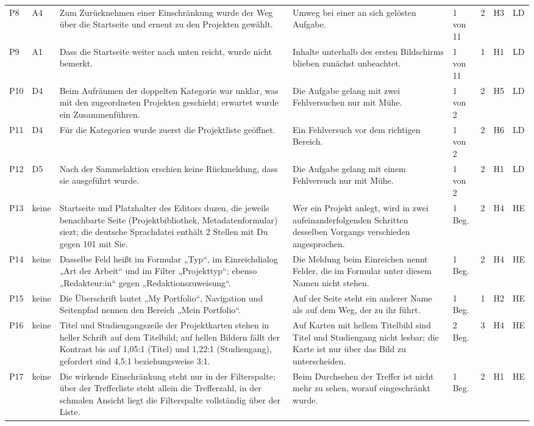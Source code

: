 \begin{longtable}{@{}L{0.6cm}L{0.8cm}L{4.9cm}L{4.0cm}L{1.2cm}L{0.7cm}L{0.7cm}L{0.8cm}@{}}
	P8 & A4 & Zum Zurücknehmen einer Einschränkung wurde der Weg über die Startseite und erneut zu den Projekten gewählt. & Umweg bei einer an sich gelösten Aufgabe. & 1 von 11 & 2 & H3 & LD \\
	P9 & A1 & Dass die Startseite weiter nach unten reicht, wurde nicht bemerkt. & Inhalte unterhalb des ersten Bildschirms blieben zunächst unbeachtet. & 1 von 11 & 1 & H1 & LD \\
	P10 & D4 & Beim Aufräumen der doppelten Kategorie war unklar, was mit den zugeordneten Projekten geschieht; erwartet wurde ein Zusammenführen. & Die Aufgabe gelang mit zwei Fehlversuchen nur mit Mühe. & 1 von 2 & 2 & H5 & LD \\
	P11 & D4 & Für die Kategorien wurde zuerst die Projektliste geöffnet. & Ein Fehlversuch vor dem richtigen Bereich. & 1 von 2 & 2 & H6 & LD \\
	P12 & D5 & Nach der Sammelaktion erschien keine Rückmeldung, dass sie ausgeführt wurde. & Die Aufgabe gelang mit einem Fehlversuch nur mit Mühe. & 1 von 2 & 2 & H1 & LD \\
	P13 & keine & Startseite und Platzhalter des Editors duzen, die jeweils benachbarte Seite (Projektbibliothek, Metadatenformular) siezt; die deutsche Sprachdatei enthält 2 Stellen mit Du gegen 101 mit Sie. & Wer ein Projekt anlegt, wird in zwei aufeinanderfolgenden Schritten desselben Vorgangs verschieden angesprochen. & 1 Beg. & 2 & H4 & HE \\
	P14 & keine & Dasselbe Feld heißt im Formular „Typ“, im Einreichdialog „Art der Arbeit“ und im Filter „Projekttyp“; ebenso „Redakteur:in“ gegen „Redaktionszuweisung“. & Die Meldung beim Einreichen nennt Felder, die im Formular unter diesem Namen nicht stehen. & 1 Beg. & 2 & H4 & HE \\
	P15 & keine & Die Überschrift lautet „My Portfolio“, Navigation und Seitenpfad nennen den Bereich „Mein Portfolio“. & Auf der Seite steht ein anderer Name als auf dem Weg, der zu ihr führt. & 1 Beg. & 1 & H2 & HE \\
	P16 & keine & Titel und Studiengangszeile der Projektkarten stehen in heller Schrift auf dem Titelbild; auf hellen Bildern fällt der Kontrast bis auf 1,05:1 (Titel) und 1,22:1 (Studiengang), gefordert sind 4,5:1 beziehungsweise 3:1. & Auf Karten mit hellem Titelbild sind Titel und Studiengang nicht lesbar; die Karte ist nur über das Bild zu unterscheiden. & 2 Beg. & 3 & H4 & HE \\
	P17 & keine & Die wirkende Einschränkung steht nur in der Filterspalte; über der Trefferliste steht allein die Trefferzahl, in der schmalen Ansicht liegt die Filterspalte vollständig über der Liste. & Beim Durchsehen der Treffer ist nicht mehr zu sehen, worauf eingeschränkt wurde. & 1 Beg. & 2 & H1 & HE \\

\end{longtable}

